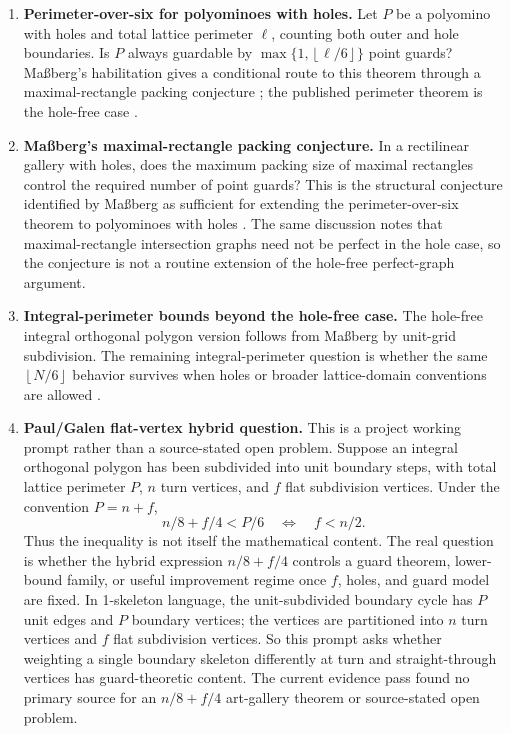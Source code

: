\documentclass[11pt]{article}
\newcommand{\floor}[1]{\left\lfloor #1 \right\rfloor}
\newcommand{\loversix}{\floor{\ell/6}}
\begin{document}
\begin{enumerate}
  \item \textbf{Perimeter-over-six for polyominoes with holes.}
  Let $P$ be a polyomino with holes and total lattice perimeter $\ell$,
  counting both outer and hole boundaries.  Is $P$ always guardable by
  $\max\{1,\loversix\}$ point guards?  Ma{\ss}berg's habilitation gives a
  conditional route to this theorem through a maximal-rectangle packing
  conjecture \cite[Lem.~6.9 and Conj.~6.10]{MassbergHabilitation}; the
  published perimeter theorem is the hole-free case
  \cite[Theorem~1]{Massberg2014}.

  \item \textbf{Ma{\ss}berg's maximal-rectangle packing conjecture.}
  In a rectilinear gallery with holes, does the maximum packing size of
  maximal rectangles control the required number of point guards?  This is the
  structural conjecture identified by Ma{\ss}berg as sufficient for extending
  the perimeter-over-six theorem to polyominoes with holes
  \cite[Conj.~6.10]{MassbergHabilitation}.  The same discussion notes that
  maximal-rectangle intersection graphs need not be perfect in the hole case,
  so the conjecture is not a routine extension of the hole-free perfect-graph
  argument.

  \item \textbf{Integral-perimeter bounds beyond the hole-free case.}
  The hole-free integral orthogonal polygon version follows from
  Ma{\ss}berg by unit-grid subdivision.  The remaining integral-perimeter
  question is whether the same $\floor{N/6}$ behavior survives when holes or
  broader lattice-domain conventions are allowed
  \cite{Massberg2014,DiazBanezEtAl2025}.

  \item \textbf{Paul/Galen flat-vertex hybrid question.}
  This is a project working prompt rather than a source-stated open problem.
  Suppose an integral orthogonal polygon has been subdivided into unit boundary
  steps, with total lattice perimeter $P$, $n$ turn vertices, and $f$ flat
  subdivision vertices.  Under the convention $P=n+f$,
  \[
    n/8+f/4<P/6 \quad\Longleftrightarrow\quad f<n/2.
  \]
  Thus the inequality is not itself the mathematical content.  The real
  question is whether the hybrid expression $n/8+f/4$ controls a guard
  theorem, lower-bound family, or useful improvement regime once $f$, holes,
  and guard model are fixed.  In 1-skeleton language, the unit-subdivided
  boundary cycle has $P$ unit edges and $P$ boundary vertices; the vertices
  are partitioned into $n$ turn vertices and $f$ flat subdivision vertices.
  So this prompt asks whether weighting a single boundary skeleton differently
  at turn and straight-through vertices has guard-theoretic content.  The
  current evidence pass found no primary source for an $n/8+f/4$ art-gallery
  theorem or source-stated open problem.


\end{enumerate}
\end{document}
